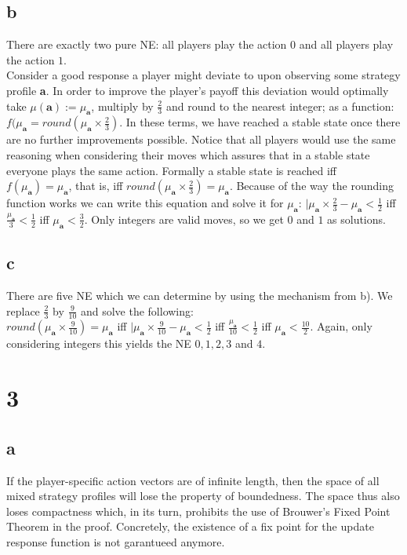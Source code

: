 \documentclass[10pt,a4paper]{article}
\begin{document}
\subsection*{b}
There are exactly two pure NE: all players play the action $0$ and all players play the action $1$.\\
Consider a good response a player might deviate to upon observing some strategy profile \textbf{a}. In order to improve the player's payoff this deviation would optimally take $\mu(\textbf{a}):=\mu_{\textbf{a}}$, multiply by $\tfrac{2}{3}$ and round to the nearest integer; as a function: $f(\mu_{\textbf{a}}=round(\mu_{\textbf{a}}\times \tfrac{2}{3})$. In these terms, we have reached a stable state once there are no further improvements possible. Notice that all players would use the same reasoning when considering their moves which assures that in a stable state everyone plays the same action. Formally a stable state is reached iff $f(\mu_{\textbf{a}})=\mu_{\textbf{a}}$, that is, iff $round(\mu_{\textbf{a}}\times \tfrac{2}{3})=\mu_{\textbf{a}}$. Because of the way the rounding function works we can write this equation and solve it for $\mu_{\textbf{a}}$: $|\mu_{\textbf{a}}\times \tfrac{2}{3}-\mu_{\textbf{a}} < \tfrac{1}{2}$ iff $\tfrac{\mu_{\textbf{a}}}{3} < \tfrac{1}{2}$ iff $\mu_{\textbf{a}} < \tfrac{3}{2}$. Only integers are valid moves, so we get $0$ and $1$ as solutions.
\subsection*{c}
There are five NE which we can determine by using the mechanism from b). We replace $\tfrac{2}{3}$ by $\tfrac{9}{10}$ and solve the following:\\
$round(\mu_{\textbf{a}}\times \tfrac{9}{10})=\mu_{\textbf{a}}$ iff $|\mu_{\textbf{a}}\times \tfrac{9}{10}-\mu_{\textbf{a}} < \tfrac{1}{2}$ iff $\tfrac{\mu_{\textbf{a}}}{10} < \tfrac{1}{2}$ iff $\mu_{\textbf{a}} < \tfrac{10}{2}$. Again, only considering integers this yields the NE $0,1,2,3$ and $4$.
\section*{3}
\subsection*{a}
If the player-specific action vectors are of infinite length, then the space of all mixed strategy profiles will lose the property of boundedness. The space thus also loses compactness which, in its turn, prohibits the use of Brouwer's Fixed Point Theorem in the proof. Concretely, the existence of a fix point for the update response function is not garantueed anymore.
\end{document}
